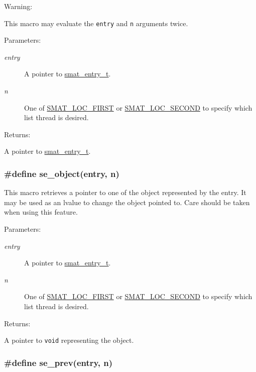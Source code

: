 \begin{Desc}
\item[Warning: ]\par
This macro may evaluate the {\tt entry} and {\tt n} arguments twice.\end{Desc}
\begin{Desc}
\item[Parameters: ]\par
\begin{description}
\item[{\em 
entry}]A pointer to \hyperlink{group__dbprim__smat_a2}{smat\_\-entry\_\-t}. \item[{\em 
n}]One of \hyperlink{group__dbprim__smat_a48a136}{SMAT\_\-LOC\_\-FIRST} or \hyperlink{group__dbprim__smat_a48a137}{SMAT\_\-LOC\_\-SECOND} to specify which list thread is desired.\end{description}
\end{Desc}
\begin{Desc}
\item[Returns: ]\par
A pointer to \hyperlink{group__dbprim__smat_a2}{smat\_\-entry\_\-t}. \end{Desc}
\hypertarget{group__dbprim__smat_a47}{
\subsubsection[se\_\-object]{\setlength{\rightskip}{0pt plus 5cm}\#define se\_\-object(entry, n)}}
\label{group__dbprim__smat_a47}


This macro retrieves a pointer to one of the object represented by the entry. It may be used as an lvalue to change the object pointed to. Care should be taken when using this feature.\begin{Desc}
\item[Parameters: ]\par
\begin{description}
\item[{\em 
entry}]A pointer to \hyperlink{group__dbprim__smat_a2}{smat\_\-entry\_\-t}. \item[{\em 
n}]One of \hyperlink{group__dbprim__smat_a48a136}{SMAT\_\-LOC\_\-FIRST} or \hyperlink{group__dbprim__smat_a48a137}{SMAT\_\-LOC\_\-SECOND} to specify which list thread is desired.\end{description}
\end{Desc}
\begin{Desc}
\item[Returns: ]\par
A pointer to {\tt void} representing the object. \end{Desc}
\hypertarget{group__dbprim__smat_a45}{
\subsubsection[se\_\-prev]{\setlength{\rightskip}{0pt plus 5cm}\#define se\_\-prev(entry, n)}}
\label{group__dbprim__smat_a45}


